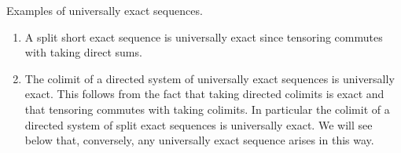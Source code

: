 \begin{example}
\label{example-universally-exact}
Examples of universally exact sequences.
\begin{enumerate}
\item A split short exact sequence is universally exact since tensoring
commutes with taking direct sums.
\item The colimit of a directed system of universally exact sequences is
universally exact.  This follows from the fact that taking directed colimits is
exact and that tensoring commutes with taking colimits.  In particular the
colimit of a directed system of split exact sequences is universally exact.  We
will see below that, conversely, any universally exact sequence arises in this
way.
\end{enumerate}
\end{example}